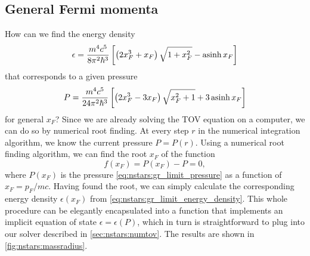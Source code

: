 \iffalse
Dimensionless equation of state
\begin{equation}
	\diml{\epsilon} = \left[ \frac{4^2 5^3}{3^4 \pi^2} \frac{m^8 c^6 r_0^6}{m_0^2 \hbar^6} \diml{P}^3 \right]^{\frac{1}{5}}
\end{equation}
\fi

\subsection{General Fermi momenta}
\label{sec:nstars:gr_limit}

How can we find the energy density
\begin{equation}
	\epsilon = \frac{m^4 c^5}{8 \pi^2 \hbar^3} \left[ \left( 2 x_F^3 + x_F \right) \sqrt{1 + x_F^2} - \operatorname{asinh} x_F \right]
\label{eq:nstars:gr_limit_energy_density}
\end{equation}
that corresponds to a given pressure
\begin{equation}
	P = \frac{m^4 c^5}{24 \pi^2 \hbar^3} \left[ \left( 2 x_F^3 - 3 x_F \right) \sqrt{x_F^2 + 1} + 3 \operatorname{asinh} x_F \right] 
\label{eq:nstars:gr_limit_pressure}
\end{equation}
for general $x_F$?
Since we are already solving the TOV equation on a computer, we can do so by numerical root finding.
At every step $r$ in the numerical integration algorithm, we know the current pressure $P = P(r)$.
Using a numerical root finding algorithm, we can find the root $x_F$ of the function
\begin{equation}
	f(x_F) = P(x_F) - P = 0,
\end{equation}
where $P(x_F)$ is the pressure \eqref{eq:nstars:gr_limit_pressure} as a function of $x_F = p_F / m c$.
Having found the root, we can simply calculate the corresponding energy density $\epsilon(x_F)$ from \cref{eq:nstars:gr_limit_energy_density}.
This whole procedure can be elegantly encapsulated into a function that implements an implicit equation of state $\epsilon = \epsilon(P)$, which in turn is straightforward to plug into our solver described in \cref{sec:nstars:numtov}.
The results are shown in \cref{fig:nstars:massradius}.

\iffalse
\begin{equation}
	\diml{P}(x_F) = \frac{m^4 c^3 r_0^3}{18 \pi m_0 \hbar^3} \left[ (2 x_F^3 - 3 x_F) \sqrt{x_F^2 + 1} + 3 \asinh x_F \right]
\end{equation}

At every integration step, we have a value of the pressure $P$.
Then find the root $x_F$ of
\begin{equation}
	P(x_F) - P = 0
\end{equation}
and then calculate
\begin{equation}
	\diml{ϵ} = \diml{ϵ}(x_F) = \diml{P}(x_F) = \frac{m^4 c^3 r_0^3}{6 \pi m_0 \hbar^3} \left[ (2 x_F^3 + x_F) \sqrt{x_F^2 + 1} - \asinh x_F \right]
\end{equation}
\fi

